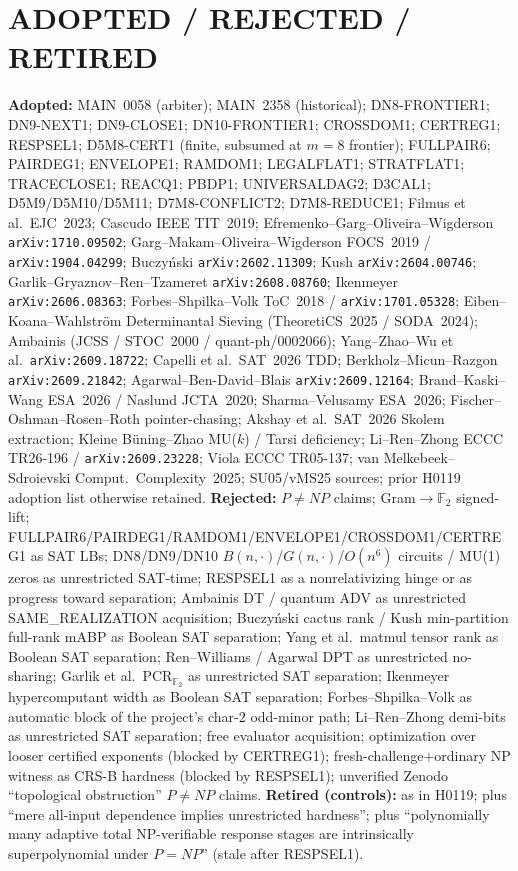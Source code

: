 \documentclass[11pt]{article}
\begin{document}
\section*{ADOPTED / REJECTED / RETIRED}
\textbf{Adopted:} MAIN~0058 (arbiter); MAIN~2358 (historical); DN8-FRONTIER1;
DN9-NEXT1; DN9-CLOSE1; DN10-FRONTIER1; CROSSDOM1; CERTREG1; RESPSEL1;
D5M8-CERT1 (finite, subsumed at $m=8$ frontier); FULLPAIR6; PAIRDEG1;
ENVELOPE1; RAMDOM1; LEGALFLAT1; STRATFLAT1; TRACECLOSE1; REACQ1; PBDP1;
UNIVERSALDAG2; D3CAL1; D5M9/D5M10/D5M11; D7M8-CONFLICT2; D7M8-REDUCE1;
Filmus et al.\ EJC~2023; Cascudo IEEE TIT~2019;
Efremenko--Garg--Oliveira--Wigderson \texttt{arXiv:1710.09502};
Garg--Makam--Oliveira--Wigderson FOCS~2019 / \texttt{arXiv:1904.04299};
Buczy\'nski \texttt{arXiv:2602.11309}; Kush \texttt{arXiv:2604.00746};
Garlik--Gryaznov--Ren--Tzameret \texttt{arXiv:2608.08760};
Ikenmeyer \texttt{arXiv:2606.08363}; Forbes--Shpilka--Volk ToC~2018 /
\texttt{arXiv:1701.05328}; Eiben--Koana--Wahlstr\"om Determinantal Sieving
(TheoretiCS~2025 / SODA~2024); Ambainis (JCSS / STOC~2000 / quant-ph/0002066);
Yang--Zhao--Wu et al.\ \texttt{arXiv:2609.18722}; Capelli et al.\ SAT~2026 TDD;
Berkholz--Micun--Razgon \texttt{arXiv:2609.21842}; Agarwal--Ben-David--Blais
\texttt{arXiv:2609.12164}; Brand--Kaski--Wang ESA~2026 / Naslund JCTA~2020;
Sharma--Velusamy ESA~2026; Fischer--Oshman--Rosen--Roth pointer-chasing;
Akshay et al.\ SAT~2026 Skolem extraction; Kleine B\"uning--Zhao MU($k$) /
Tarsi deficiency; Li--Ren--Zhong ECCC TR26-196 / \texttt{arXiv:2609.23228};
Viola ECCC TR05-137; van Melkebeek--Sdroievski Comput.\ Complexity~2025;
SU05/vMS25 sources; prior H0119 adoption list otherwise retained.
\textbf{Rejected:} $P\neq NP$ claims; Gram$\to\mathbb F_2$ signed-lift;
FULLPAIR6/PAIRDEG1/RAMDOM1/ENVELOPE1/CROSSDOM1/CERTREG1 as SAT LBs;
DN8/DN9/DN10 $B(n,\cdot)$/$G(n,\cdot)$/$O(n^6)$ circuits / MU(1) zeros as
unrestricted SAT-time; RESPSEL1 as a nonrelativizing hinge or as progress
toward separation; Ambainis DT / quantum ADV as unrestricted SAME\_REALIZATION
acquisition; Buczy\'nski cactus rank / Kush min-partition full-rank mABP as
Boolean SAT separation; Yang et al.\ matmul tensor rank as Boolean SAT
separation; Ren--Williams / Agarwal DPT as unrestricted no-sharing;
Garlik et al.\ PCR$_{\mathbb F_2}$ as unrestricted SAT separation;
Ikenmeyer hypercomputant width as Boolean SAT separation;
Forbes--Shpilka--Volk as automatic block of the project's char-$2$ odd-minor
path; Li--Ren--Zhong demi-bits as unrestricted SAT separation; free evaluator
acquisition; optimization over looser certified exponents (blocked by
CERTREG1); fresh-challenge$+$ordinary NP witness as CRS-B hardness (blocked
by RESPSEL1); unverified Zenodo ``topological obstruction'' $P\neq NP$ claims.
\textbf{Retired (controls):} as in H0119; plus ``mere all-input dependence
implies unrestricted hardness''; plus ``polynomially many adaptive total
NP-verifiable response stages are intrinsically superpolynomial under
$P=NP$'' (stale after RESPSEL1).
\end{document}
